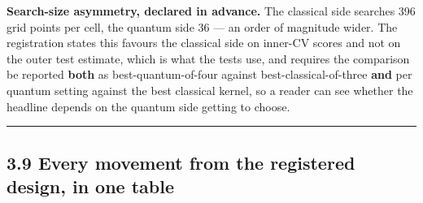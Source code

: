 \documentclass[
  10pt,
]{article}
\begin{document}
\textbf{Search-size asymmetry, declared in advance.} The classical side
searches 396 grid points per cell, the quantum side 36 --- an order of
magnitude wider. The registration states this favours the classical side
on inner-CV scores and not on the outer test estimate, which is what the
tests use, and requires the comparison be reported \textbf{both} as
best-quantum-of-four against best-classical-of-three \textbf{and} per
quantum setting against the best classical kernel, so a reader can see
whether the headline depends on the quantum side getting to choose.

\begin{center}\rule{0.5\linewidth}{0.5pt}\end{center}

\subsection{3.9 Every movement from the registered design, in one
table}\label{every-movement-from-the-registered-design-in-one-table}
\end{document}
